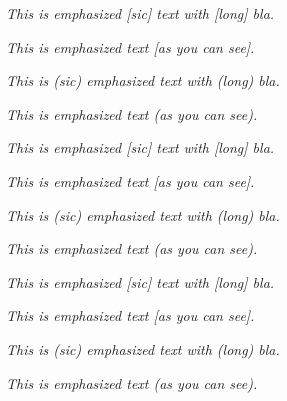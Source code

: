 \documentclass{scrartcl}
\begin{document}
\emph{This is emphasized [sic] text with [long] bla.}

\emph{This is emphasized text [as you can see].}

\emph{This is (sic) emphasized text with (long) bla.}

\emph{This is emphasized text (as you can see).}

\hrulefill

\RenewEmph{[}{]}
\RenewEmph{(}{)}
\emph{This is emphasized [sic] text with [long] bla.}

\emph{This is emphasized text [as you can see].}

\emph{This is (sic) emphasized text with (long) bla.}

\emph{This is emphasized text (as you can see).}

\hrulefill

\emph{This is emphasized [sic] text with [long] bla.}

\emph{This is emphasized text [as you can see].}

\emph{This is (sic) emphasized text with (long) bla.}

\emph{This is emphasized text (as you can see).}
\end{document}
